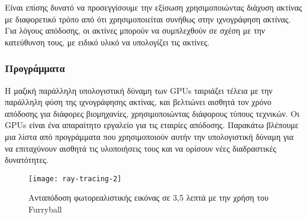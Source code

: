 Είναι επίσης δυνατό να προσεγγίσουμε την εξίσωση χρησιμοποιώντας διάχυση ακτίνας με διαφορετικό τρόπο από ότι χρησιμοποιείται συνήθως στην ιχνογράφηση ακτίνας. Για λόγους απόδοσης, οι ακτίνες μπορούν να συμπλεχθούν σε σχέση με την κατεύθυνση τους, με ειδικό υλικό να υπολογίζει τις ακτίνες.

\subsubsection{Προγράμματα}
Η μαζική παράλληλη υπολογιστική δύναμη των GPUs ταιριάζει τέλεια με την παράλληλη φύση της ιχνογράφησης ακτίνας, και βελτιώνει αισθητά τον χρόνο απόδοσης για διάφορες βιομηχανίες, χρησιμοποιώντας διάφορους τύπους τεχνικών. Οι GPUs είναι ένα απαραίτητο εργαλείο για τις εταιρίες απόδοσης. Παρακάτω βλέπουμε μια λίστα από προγράμματα που χρησιμοποιούν αυτήν την υπολογιστική δύναμη για να επιταχύνουν αισθητά τις υλοποιήσεις τους και να ορίσουν νέες διαδραστικές δυνατότητες.

\begin{figure}[h]
\centering
\texttt{[image: ray-tracing-2]}
\caption{Ανταπόδοση φωτορεαλιστικής εικόνας σε 3,5 λεπτά με την χρήση του Furryball\cite{figure-16}}
\end{figure}


